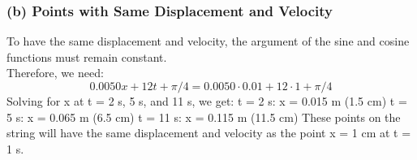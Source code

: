 \documentclass{article}
\begin{document}
\subsubsection*{(b) Points with Same Displacement and Velocity}
To have the same displacement and velocity, the argument of the sine and cosine functions must remain constant.
\\Therefore, we need:
\begin{equation}
0.0050x + 12t + \pi/4 = 0.0050 \cdot 0.01 + 12 \cdot 1 + \pi/4
\end{equation}
Solving for x at t = 2 s, 5 s, and 11 s, we get:
\begingroup
\obeylines
 t = 2 s: x = 0.015 m (1.5 cm)
 t = 5 s: x = 0.065 m (6.5 cm)
 t = 11 s: x = 0.115 m (11.5 cm)
 \endgroup
\noindent These points on the string will have the same displacement and velocity as the point x = 1 cm at t = 1 s.
\end{document}
